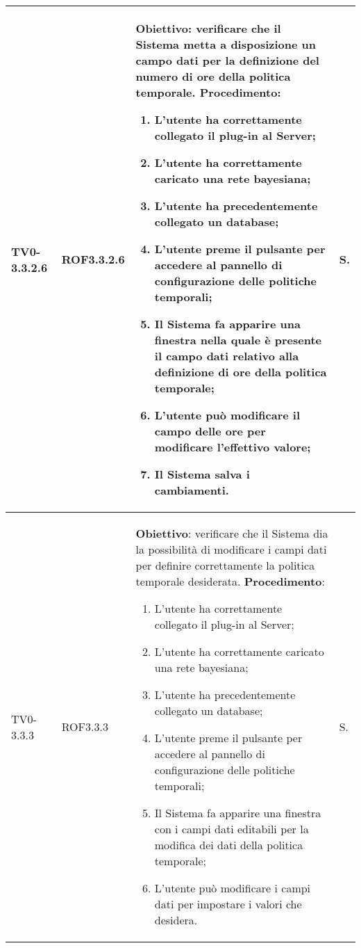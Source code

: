 \begin{longtable}{|C{.15\textwidth}|C{.13\textwidth}|m{.65\textwidth}|C{.08\textwidth}|}
TV0-3.3.2.6 & ROF3.3.2.6 &
	\textbf{Obiettivo}: verificare che il Sistema metta a disposizione un campo dati per la definizione del numero di ore della politica temporale. \newline
	\textbf{Procedimento}:
	\begin{enumerate}
		\item L'utente ha correttamente collegato il plug-in al Server;
		\item L'utente ha correttamente caricato una rete bayesiana;
		\item L'utente ha precedentemente collegato un database;
		\item L'utente preme il pulsante per accedere al pannello di configurazione delle politiche temporali;
		\item Il Sistema fa apparire una finestra nella quale è presente il campo dati relativo alla definizione di ore della politica temporale;
		\item L'utente può modificare il campo delle ore per modificare l'effettivo valore;
		\item Il Sistema salva i cambiamenti.
	\end{enumerate}
	& S. \\
\hline

TV0-3.3.3 & ROF3.3.3 &
	\textbf{Obiettivo}: verificare che il Sistema dia la possibilità di modificare i campi dati per definire correttamente la politica temporale desiderata. \newline
	\textbf{Procedimento}:
	\begin{enumerate}
		\item L'utente ha correttamente collegato il plug-in al Server;
		\item L'utente ha correttamente caricato una rete bayesiana;
		\item L'utente ha precedentemente collegato un database;
		\item L'utente preme il pulsante per accedere al pannello di configurazione delle politiche temporali;
		\item Il Sistema fa apparire una finestra con i campi dati editabili per la modifica dei dati della politica temporale;
		\item L'utente può modificare i campi dati per impostare i valori che desidera.
	\end{enumerate}
	& S. \\
\hline


\end{longtable}
